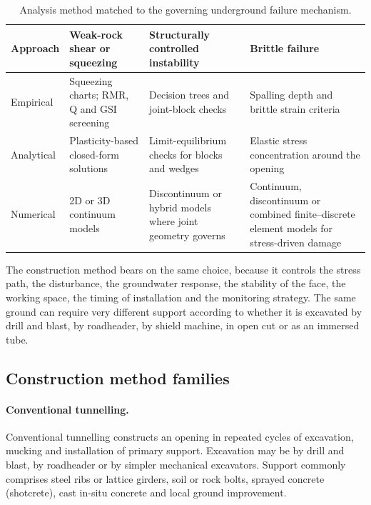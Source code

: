 \begin{table}[htbp]
\caption{Analysis method matched to the governing underground failure mechanism.}
\label{tab:method-by-mechanism}
\centering
\small
\begin{tabularx}{\textwidth}{p{} X X X}
\toprule
\textbf{Approach} & \textbf{Weak-rock shear or squeezing} & \textbf{Structurally controlled instability} & \textbf{Brittle failure} \\
\midrule
Empirical & Squeezing charts; RMR, Q and GSI screening & Decision trees and joint-block checks & Spalling depth and brittle strain criteria \\
Analytical & Plasticity-based closed-form solutions & Limit-equilibrium checks for blocks and wedges & Elastic stress concentration around the opening \\
Numerical & 2D or 3D continuum models & Discontinuum or hybrid models where joint geometry governs & Continuum, discontinuum or combined finite--discrete element models for stress-driven damage \\
\bottomrule
\end{tabularx}
\end{table}

The construction method bears on the same choice, because it controls the
stress path, the disturbance, the groundwater response, the stability of the
face, the working space, the timing of installation and the monitoring
strategy. The same ground can require very different support according to
whether it is excavated by drill and blast, by roadheader, by shield machine,
in open cut or as an immersed tube.

\subsection{Construction method families}
\label{sec:construction-method-families}

\paragraph{Conventional tunnelling.}
\label{sec:conventional-tunnelling}
Conventional tunnelling constructs an opening in repeated cycles of
excavation, mucking and installation of primary support. Excavation may be by
drill and blast, by roadheader or by simpler mechanical excavators. Support
commonly comprises steel ribs or lattice girders, soil or rock bolts, sprayed
concrete (shotcrete), cast in-situ concrete and local ground improvement.

